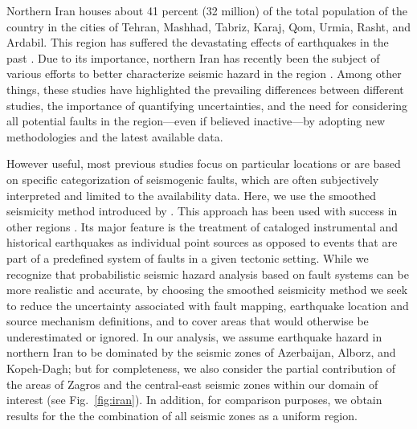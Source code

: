 Northern Iran houses about 41 percent (32 million) of the total population of the country in the cities of Tehran, Mashhad, Tabriz, Karaj, Qom, Urmia, Rasht, and Ardabil. This region has suffered the devastating effects of earthquakes in the past \citep[e.g.,][]{Mehrain_1990_Tech, Chafory-Ashtiany_1999_DPM, Razzaghi_2012_Tech}. Due to its importance, northern Iran has recently been the subject of various efforts to better characterize seismic hazard in the region \citep[e.g.,][]{Abdollahzadeh2014a, Boostan2015}. Among other things, these studies have highlighted the prevailing differences between different studies, the importance of quantifying uncertainties, and the need for considering all potential faults in the region---even if believed inactive---by adopting new methodologies and the latest available data.

However useful, most previous studies focus on particular locations or are based on specific categorization of seismogenic faults, which are often subjectively interpreted and limited to the availability data. Here, we use the smoothed seismicity method introduced by \citet{Frankel1995}. This approach has been used with success in other regions \citep[e.g.][]{Boyd2008, Kalkan2009, Moschetti2014}. Its major feature is the treatment of cataloged instrumental and historical earthquakes as individual point sources as opposed to events that are part of a predefined system of faults in a given tectonic setting. While we recognize that probabilistic seismic hazard analysis based on fault systems can be more realistic and accurate, by choosing the smoothed seismicity method we seek to reduce the uncertainty associated with fault mapping, earthquake location and source mechanism definitions, and to cover areas that would otherwise be underestimated or ignored. In our analysis, we assume earthquake hazard in northern Iran to be dominated by the seismic zones of Azerbaijan, Alborz, and Kopeh-Dagh; but for completeness, we also consider the partial contribution of the areas of Zagros and the central-east seismic zones within our domain of interest (see Fig.~\ref{fig:iran}). In addition, for comparison purposes, we obtain results for the the combination of all seismic zones as a uniform region.

